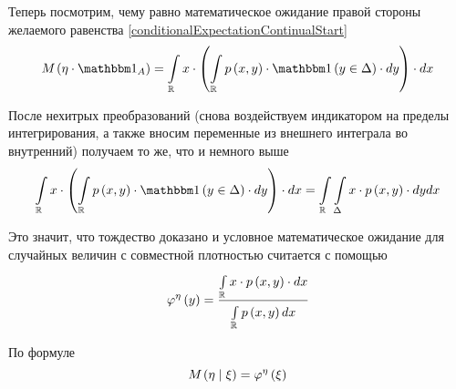 Теперь посмотрим, чему равно математическое ожидание правой стороны
желаемого равенства \eqref{conditionalExpectationContinualStart}
$$\mean{\left( \eta \cdot \indicatorof{A} \right)}
    = \integral{\mathbb{R}}{}{x}{
        x \cdot \left(
            \integral{\mathbb{R}}{}{y}{
                \pdf{x,y} \cdot \indicator{y \in \Delta} \cdot} \right)
            \cdot}$$

После нехитрых преобразований
(снова воздействуем индикатором на пределы интегрирования,
а также вносим переменные из внешнего интеграла во внутренний)
получаем то же, что и немного выше
$$\integral{\mathbb{R}}{}{x}{
        x \cdot \left(
            \integral{\mathbb{R}}{}{y}{
                \pdf{x,y} \cdot \indicator{y \in \Delta} \cdot} \right)
            \cdot}
        = \integral{\mathbb{R}}{}{x}{\integral{\Delta}{}{y}{
        x \cdot \pdf{x,y} \cdot}}$$

Это значит, что тождество доказано и условное математическое ожидание
для случайных величин с совместной плотностью считается с помощью
$$\varphi^{\eta}\left( y \right)
    = \frac{\integral{\mathbb{R}}{}{x}{x \cdot \pdf{x,y} \cdot}}
                {\integral{\mathbb{R}}{}{x}{\pdf{x,y}}}$$

По формуле
$$\mean{\left( \eta \mid \xi \right)} = \varphi^{\eta}\left( \xi \right)$$
